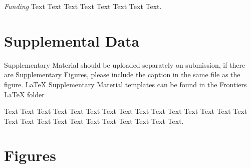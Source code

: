 \documentclass{frontiersSCNS} %
\begin{document}
\textit{Funding\textcolon} Text Text Text Text Text Text  Text Text.

\section*{Supplemental Data}
Supplementary Material should be uploaded separately on submission, if there are Supplementary Figures, please include the caption in the same file as the figure. LaTeX Supplementary Material templates can be found in the Frontiers LaTeX folder

Text Text Text Text Text Text  Text Text Text Text Text Text Text Text  Text Text Text Text Text Text Text Text Text  Text Text Text.





\section*{Figures}

\end{document}
